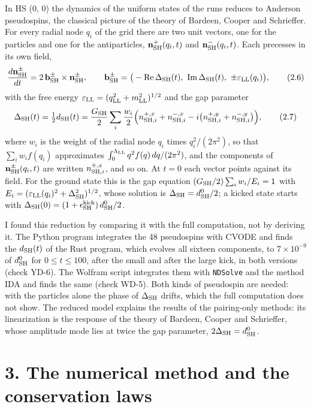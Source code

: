 \documentclass[
  10pt,
]{article}
\begin{document}
In HS (0, 0) the dynamics of the uniform states of the runs reduces to
Anderson pseudospins, the classical picture of the theory of Bardeen,
Cooper and Schrieffer. For every radial node \(q_i\) of the grid there
are two unit vectors, one for the particles and one for the
antiparticles, \(\mathbf n^+_{\rm SH}(q_i,t)\) and
\(\mathbf n^-_{\rm SH}(q_i,t)\). Each precesses in its own field,
\[\frac{d\mathbf n^\pm_{\rm SH}}{dt}=2\,\mathbf b^\pm_{\rm SH}\times\mathbf n^\pm_{\rm SH},\qquad
\mathbf b^\pm_{\rm SH}=\big(-\mathrm{Re}\,\Delta_{\rm SH}(t),\ \mathrm{Im}\,\Delta_{\rm SH}(t),\ \pm\varepsilon_{\rm LL}(q_i)\big),\tag{2.6}\]
with the free energy
\(\varepsilon_{\rm LL}=(q_{\rm LL}^2+m_{\rm LL}^2)^{1/2}\) and the gap
parameter
\[\Delta_{\rm SH}(t)=\tfrac12d_{\rm SH}(t)=\frac{G_{\rm SH}}{2}\sum_i\frac{w_i}{2}\Big(n^{+,x}_{{\rm SH},i}+n^{-,x}_{{\rm SH},i}-i\big(n^{+,y}_{{\rm SH},i}+n^{-,y}_{{\rm SH},i}\big)\Big),\tag{2.7}\]
where \(w_i\) is the weight of the radial node \(q_i\) times
\(q_i^2/(2\pi^2)\), so that \(\sum_iw_if(q_i)\) approximates
\(\int_0^{\Lambda_{\rm LL}}q^2f(q)\,dq/(2\pi^2)\), and the components of
\(\mathbf n^\pm_{\rm SH}(q_i,t)\) are written
\(n^{\pm,x}_{{\rm SH},i}\), and so on. At \(t=0\) each vector points
against its field. For the ground state this is the gap equation
\((G_{\rm SH}/2)\sum_iw_i/E_i=1\) with
\(E_i=(\varepsilon_{\rm LL}(q_i)^2+\Delta_{\rm SH}^2)^{1/2}\), whose
solution is \(\Delta_{\rm SH}=d^0_{\rm SH}/2\); a kicked state starts
with
\(\Delta_{\rm SH}(0)=(1+\epsilon^{\rm kick}_{\rm SH})\,d^0_{\rm SH}/2\).

I found this reduction by comparing it with the full computation, not by
deriving it. The Python program integrates the 48 pseudospins with CVODE
and finds the \(d_{\rm SH}(t)\) of the Rust program, which evolves all
sixteen components, to \(7\times10^{-9}\) of \(d^0_{\rm SH}\) for
\(0\le t\le100\), after the small and after the large kick, in both
versions (check YD-6). The Wolfram script integrates them with
\texttt{NDSolve} and the method IDA and finds the same (check WD-5).
Both kinds of pseudospin are needed: with the particles alone the phase
of \(\Delta_{\rm SH}\) drifts, which the full computation does not show.
The reduced model explains the results of the pairing-only methods: its
linearization is the response of the theory of Bardeen, Cooper and
Schrieffer, whose amplitude mode lies at twice the gap parameter,
\(2\Delta_{\rm SH}=d^0_{\rm SH}\).

\hypertarget{the-numerical-method-and-the-conservation-laws}{%
\section{3. The numerical method and the conservation
laws}\label{the-numerical-method-and-the-conservation-laws}}
\end{document}
